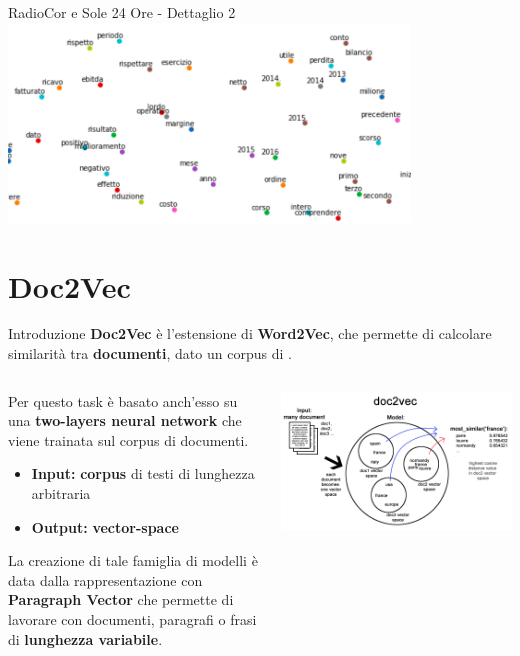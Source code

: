 \documentclass[british]{beamer}
\begin{document}
\begin{frame}{RadioCor e Sole 24 Ore - Dettaglio 2}
	\includegraphics[width= 0.8\textwidth]{./Imgs/plot-anni.png}
\end{frame}

\section{Doc2Vec}

\begin{frame}{Introduzione}
	\textbf{Doc2Vec} \`{e} l'estensione di \textbf{Word2Vec}, che permette di calcolare similarit\`{a} tra \textbf{documenti}, dato un corpus di .
	\begin{columns}
		\begin{column}{0.5\linewidth}
			Per questo task \`{e} basato anch'esso su una \textbf{\alert{two-layers neural network}} che viene trainata sul corpus di documenti. 
			\begin{itemize}
				\item \textbf{Input: }\textbf{corpus} di testi di lunghezza arbitraria
				\item \textbf{Output: }\textbf{vector-space}
			\end{itemize}
			La creazione di tale famiglia di modelli è data dalla rappresentazione con \textbf{Paragraph Vector} che permette di lavorare con documenti, paragrafi o frasi di \textbf{lunghezza variabile}.	
		\end{column}
		\begin{column}{0.5\linewidth}
			\includegraphics[width=\textwidth]{./Imgs/doc2vec-working.png}
		\end{column}
	\end{columns}
\end{frame}
\end{document}
